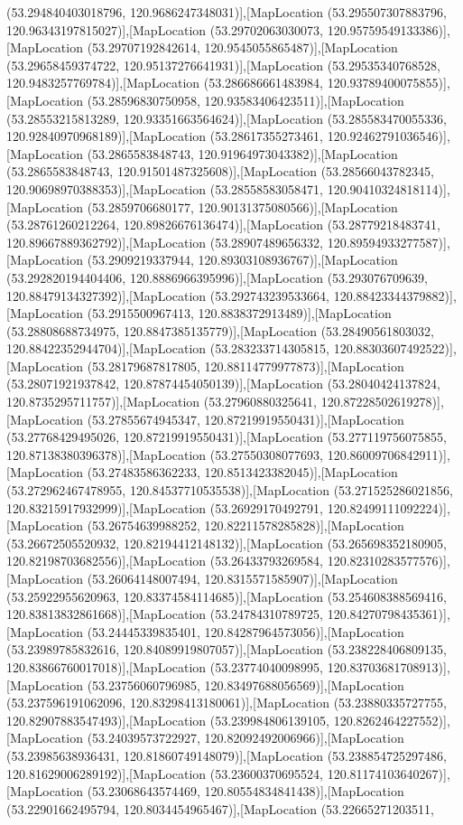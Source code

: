(53.294840403018796, 120.9686247348031)],[MapLocation (53.295507307883796, 120.96343197815027)],[MapLocation (53.29702063030073, 120.95759549133386)],[MapLocation (53.29707192842614, 120.9545055865487)],[MapLocation (53.29658459374722, 120.95137276641931)],[MapLocation (53.29535340768528, 120.9483257769784)],[MapLocation (53.286686661483984, 120.93789400075855)],[MapLocation (53.28596830750958, 120.93583406423511)],[MapLocation (53.28553215813289, 120.93351663564624)],[MapLocation (53.285583470055336, 120.92840970968189)],[MapLocation (53.28617355273461, 120.92462791036546)],[MapLocation (53.2865583848743, 120.91964973043382)],[MapLocation (53.2865583848743, 120.91501487325608)],[MapLocation (53.28566043782345, 120.90698970388353)],[MapLocation (53.28558583058471, 120.90410324818114)],[MapLocation (53.2859706680177, 120.90131375080566)],[MapLocation (53.28761260212264, 120.89826676136474)],[MapLocation (53.28779218483741, 120.89667889362792)],[MapLocation (53.28907489656332, 120.89594933277587)],[MapLocation (53.2909219337944, 120.89303108936767)],[MapLocation (53.292820194404406, 120.8886966395996)],[MapLocation (53.293076709639, 120.88479134327392)],[MapLocation (53.292743239533664, 120.88423344379882)],[MapLocation (53.2915500967413, 120.8838372913489)],[MapLocation (53.28808688734975, 120.8847385135779)],[MapLocation (53.28490561803032, 120.88422352944704)],[MapLocation (53.283233714305815, 120.88303607492522)],[MapLocation (53.28179687817805, 120.88114779977873)],[MapLocation (53.28071921937842, 120.87874454050139)],[MapLocation (53.28040424137824, 120.8735295711757)],[MapLocation (53.27960880325641, 120.87228502619278)],[MapLocation (53.27855674945347, 120.87219919550431)],[MapLocation (53.27768429495026, 120.87219919550431)],[MapLocation (53.277119756075855, 120.87138380396378)],[MapLocation (53.27550308077693, 120.86009706842911)],[MapLocation (53.27483586362233, 120.8513423382045)],[MapLocation (53.272962467478955, 120.84537710535538)],[MapLocation (53.271525286021856, 120.83215917932999)],[MapLocation (53.26929170492791, 120.82499111092224)],[MapLocation (53.26754639988252, 120.82211578285828)],[MapLocation (53.26672505520932, 120.82194412148132)],[MapLocation (53.265698352180905, 120.82198703682556)],[MapLocation (53.26433793269584, 120.82310283577576)],[MapLocation (53.26064148007494, 120.8315571585907)],[MapLocation (53.25922955620963, 120.83374584114685)],[MapLocation (53.254608388569416, 120.83813832861668)],[MapLocation (53.24784310789725, 120.84270798435361)],[MapLocation (53.24445339835401, 120.84287964573056)],[MapLocation (53.23989785832616, 120.84089919807057)],[MapLocation (53.238228406809135, 120.83866760017018)],[MapLocation (53.23774040098995, 120.83703681708913)],[MapLocation (53.23756060796985, 120.83497688056569)],[MapLocation (53.237596191062096, 120.83298413180061)],[MapLocation (53.23880335727755, 120.82907883547493)],[MapLocation (53.239984806139105, 120.8262464227552)],[MapLocation (53.24039573722927, 120.82092492006966)],[MapLocation (53.23985638936431, 120.81860749148079)],[MapLocation (53.238854725297486, 120.81629006289192)],[MapLocation (53.23600370695524, 120.81174103640267)],[MapLocation (53.23068643574469, 120.80554834841438)],[MapLocation (53.22901662495794, 120.8034454965467)],[MapLocation (53.22665271203511, 